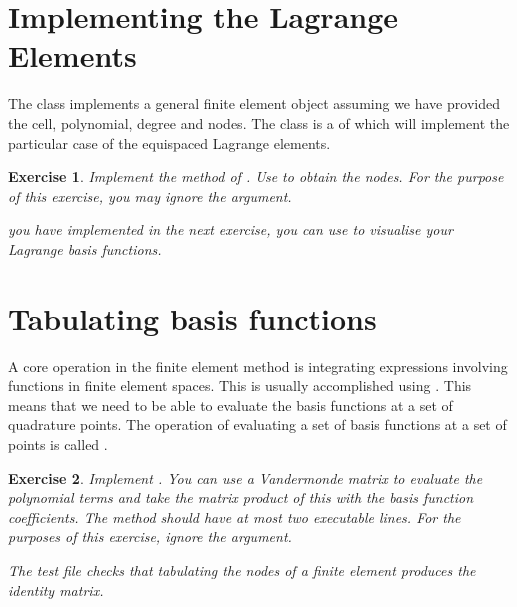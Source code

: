 \documentclass{book}
\newtheorem{exercise}{Exercise}
\begin{document}
\section{Implementing the Lagrange Elements}
\label{\detokenize{2_finite_elements:implementing-the-lagrange-elements}}
The  class implements
a general finite element object assuming we have provided the cell,
polynomial, degree and nodes. The
 class is a
 of
 which will implement
the particular case of the equispaced Lagrange elements.

\label{\detokenize{2_finite_elements:ex-lagrange-element}}
\begin{exercise}
Implement the  method of
. Use
 to obtain the
nodes. For the purpose of this exercise, you may ignore the
 argument.

 you have implemented
 in the
next exercise, you can use
 to visualise your
Lagrange basis functions.
\end{exercise}

\section{Tabulating basis functions}
\label{\detokenize{2_finite_elements:tabulating-basis-functions}}
A core operation in the finite element method is integrating
expressions involving functions in finite element spaces. This is
usually accomplished using {\hyperref[\detokenize{1_quadrature::doc}]{}}. This means that we need to be able to evaluate the
basis functions at a set of quadrature points. The operation of
evaluating a set of basis functions at a set of points is called
.

\label{\detokenize{2_finite_elements:ex-tabulate}}
\begin{exercise}
Implement .
You can use a Vandermonde matrix to evaluate the polynomial terms
and take the matrix product of this with the basis function
coefficients. The method should have at most two executable
lines. For the purposes of this exercise, ignore the 
argument.

The test file  checks that tabulating the
nodes of a finite element produces the identity matrix.
\end{exercise}
\end{document}
